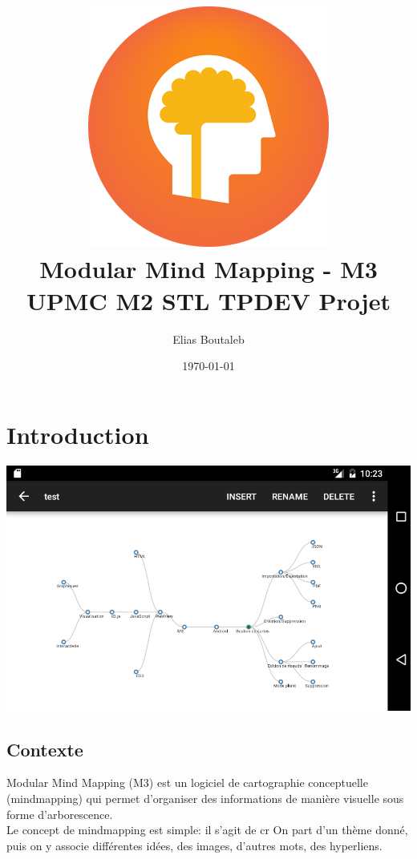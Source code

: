 \documentclass[11pt,a4paper,margin=0.5in]{report}
\title{ \includegraphics[scale=0.33]{m3.png} \\[0.25in]Modular Mind Mapping - M3 \\ UPMC M2 STL TPDEV Projet}
\author{Elias Boutaleb}
\date{\today}
\begin{document}
\maketitle
\tableofcontents

\chapter{Introduction}

\begin{center}
\includegraphics[scale=0.5]{mm.png} \\[0.25in]
\end{center}

\section{Contexte}

Modular Mind Mapping (M3) est un logiciel de cartographie conceptuelle (mindmapping) qui permet d'organiser des informations de manière
visuelle sous forme d'arborescence. \\[0.25in]

Le concept de mindmapping est simple: il s'agit de cr
On part d'un thème donné, puis on y associe différentes idées, des images, d'autres mots, des hyperliens.
\end{document}

